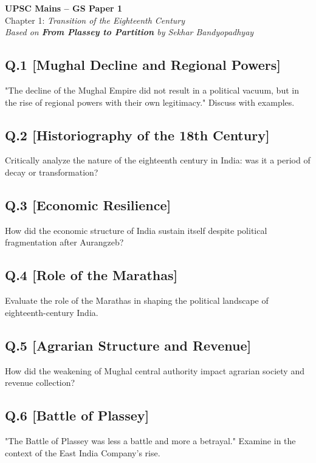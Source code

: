 
\begin{center}
    \Large\textbf{UPSC Mains – GS Paper 1}\\
    \normalsize Chapter 1: \textit{Transition of the Eighteenth Century}\\
    \vspace{0.5em}
    \textit{Based on \textbf{From Plassey to Partition} by Sekhar Bandyopadhyay}
\end{center}

\vspace{1em}

\subsection*{Q.1 [Mughal Decline and Regional Powers]}
"The decline of the Mughal Empire did not result in a political vacuum, but in the rise of regional powers with their own legitimacy." Discuss with examples.

\subsection*{Q.2 [Historiography of the 18th Century]}
Critically analyze the nature of the eighteenth century in India: was it a period of decay or transformation?

\subsection*{Q.3 [Economic Resilience]}
How did the economic structure of India sustain itself despite political fragmentation after Aurangzeb?

\subsection*{Q.4 [Role of the Marathas]}
Evaluate the role of the Marathas in shaping the political landscape of eighteenth-century India.

\subsection*{Q.5 [Agrarian Structure and Revenue]}
How did the weakening of Mughal central authority impact agrarian society and revenue collection?

\subsection*{Q.6 [Battle of Plassey]}
"The Battle of Plassey was less a battle and more a betrayal." Examine in the context of the East India Company’s rise.

